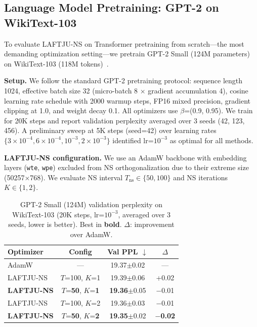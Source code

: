 \documentclass[10pt,twocolumn]{article}
\newcommand{\method}{LAFTJU}
\begin{document}
\subsection{Language Model Pretraining: GPT-2 on WikiText-103}
\label{sec:gpt2}

To evaluate \method{}-NS on Transformer pretraining from scratch---the most demanding optimization setting---we pretrain GPT-2 Small (124M parameters)~\cite{gpt2} on WikiText-103 (118M tokens)~\cite{wikitext}.

\textbf{Setup.} We follow the standard GPT-2 pretraining protocol: sequence length 1024, effective batch size 32 (micro-batch 8 $\times$ gradient accumulation 4), cosine learning rate schedule with 2000 warmup steps, FP16 mixed precision, gradient clipping at 1.0, and weight decay 0.1. All optimizers use $\beta$=(0.9, 0.95). We train for 20K steps and report validation perplexity averaged over 3 seeds (42, 123, 456). A preliminary sweep at 5K steps (seed=42) over learning rates $\{3\times10^{-4}, 6\times10^{-4}, 10^{-3}, 2\times10^{-3}\}$ identified lr=$10^{-3}$ as optimal for all methods.

\textbf{\method{}-NS configuration.} We use an AdamW backbone with embedding layers (\texttt{wte}, \texttt{wpe}) excluded from NS orthogonalization due to their extreme size (50257$\times$768). We evaluate NS interval $T_\mathrm{ns} \in \{50, 100\}$ and NS iterations $K \in \{1, 2\}$.

\begin{table}[t]
\centering
\caption{GPT-2 Small (124M) validation perplexity on WikiText-103 (20K steps, lr=$10^{-3}$, averaged over 3 seeds, lower is better). Best in \textbf{bold}. $\Delta$: improvement over AdamW.}
\label{tab:gpt2}
\small
\begin{tabular}{@{}lccc@{}}
\toprule
\textbf{Optimizer} & \textbf{Config} & \textbf{Val PPL $\downarrow$} & \textbf{$\Delta$} \\
\midrule
AdamW & --- & 19.37$\pm$0.02 & --- \\
\method{}-NS & $T$=100, $K$=1 & 19.39$\pm$0.06 & +0.02 \\
\textbf{\method{}-NS} & $T$=\textbf{50}, $K$=\textbf{1} & \textbf{19.36}$\pm$0.05 & $-$0.01 \\
\method{}-NS & $T$=100, $K$=2 & 19.36$\pm$0.03 & $-$0.01 \\
\textbf{\method{}-NS} & $T$=\textbf{50}, $K$=\textbf{2} & \textbf{19.35}$\pm$0.02 & $\mathbf{-}$\textbf{0.02} \\
\bottomrule
\end{tabular}
\end{table}
\end{document}
